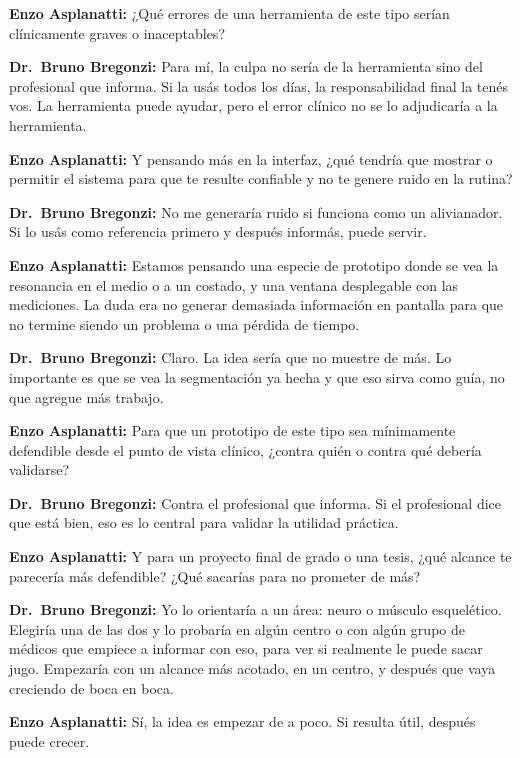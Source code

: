 \noindent\textbf{Enzo Asplanatti:} ¿Qué errores de una herramienta de este tipo serían clínicamente graves o inaceptables?

\noindent\textbf{Dr.~Bruno Bregonzi:} Para mí, la culpa no sería de la herramienta sino del profesional que informa. Si la usás todos los días, la responsabilidad final la tenés vos. La herramienta puede ayudar, pero el error clínico no se lo adjudicaría a la herramienta.

\noindent\textbf{Enzo Asplanatti:} Y pensando más en la interfaz, ¿qué tendría que mostrar o permitir el sistema para que te resulte confiable y no te genere ruido en la rutina?

\noindent\textbf{Dr.~Bruno Bregonzi:} No me generaría ruido si funciona como un alivianador. Si lo usás como referencia primero y después informás, puede servir.

\noindent\textbf{Enzo Asplanatti:} Estamos pensando una especie de prototipo donde se vea la resonancia en el medio o a un costado, y una ventana desplegable con las mediciones. La duda era no generar demasiada información en pantalla para que no termine siendo un problema o una pérdida de tiempo.

\noindent\textbf{Dr.~Bruno Bregonzi:} Claro. La idea sería que no muestre de más. Lo importante es que se vea la segmentación ya hecha y que eso sirva como guía, no que agregue más trabajo.

\noindent\textbf{Enzo Asplanatti:} Para que un prototipo de este tipo sea mínimamente defendible desde el punto de vista clínico, ¿contra quién o contra qué debería validarse?

\noindent\textbf{Dr.~Bruno Bregonzi:} Contra el profesional que informa. Si el profesional dice que está bien, eso es lo central para validar la utilidad práctica.

\noindent\textbf{Enzo Asplanatti:} Y para un proyecto final de grado o una tesis, ¿qué alcance te parecería más defendible? ¿Qué sacarías para no prometer de más?

\noindent\textbf{Dr.~Bruno Bregonzi:} Yo lo orientaría a un área: neuro o músculo esquelético. Elegiría una de las dos y lo probaría en algún centro o con algún grupo de médicos que empiece a informar con eso, para ver si realmente le puede sacar jugo. Empezaría con un alcance más acotado, en un centro, y después que vaya creciendo de boca en boca.

\noindent\textbf{Enzo Asplanatti:} Sí, la idea es empezar de a poco. Si resulta útil, después puede crecer.

